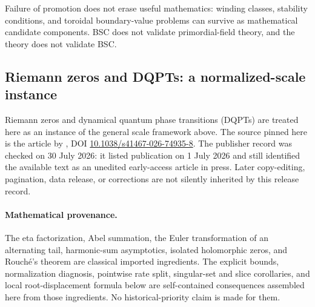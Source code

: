 \documentclass[11pt,a4paper]{article}
\theoremstyle{definition}
\theoremstyle{plain}
\theoremstyle{remark}
\begin{document}
Failure of promotion does not erase useful mathematics: winding classes,
stability conditions, and toroidal boundary-value problems can survive as
mathematical candidate components.  BSC does not validate primordial-field
theory, and the theory does not validate BSC.

\subsection{Riemann zeros and DQPTs: a normalized-scale instance}
\label{sec:zeta-dqpt}

Riemann zeros and dynamical quantum phase transitions (DQPTs) are treated here
as an instance of the general scale framework above.
The source pinned here is the article by \citet{wei2026riemanndqpt}, DOI
\href{https://doi.org/10.1038/s41467-026-74935-8}
{10.1038/s41467-026-74935-8}.  The publisher record was checked on 30 July
2026: it listed publication on 1 July 2026 and still identified the available
text as an unedited early-access article in press.  Later copy-editing,
pagination, data release, or corrections are not silently inherited by this
release record.

\paragraph{Mathematical provenance.}
The eta factorization, Abel summation, the Euler transformation of an
alternating tail, harmonic-sum asymptotics, isolated holomorphic zeros, and
Rouch\'e's theorem are classical imported ingredients.  The explicit bounds,
normalization diagnosis, pointwise rate split, singular-set and slice
corollaries, and local root-displacement formula below are self-contained
consequences assembled here from those ingredients.  No historical-priority
claim is made for them.
\end{document}
